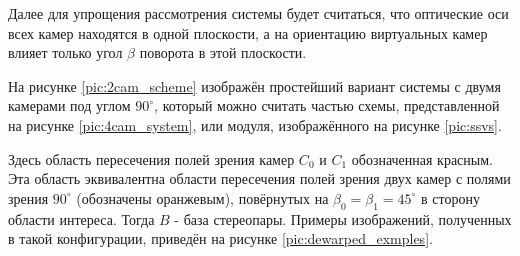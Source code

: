 Далее для упрощения рассмотрения системы будет считаться, что оптические оси всех камер находятся в одной плоскости, 
а на ориентацию виртуальных камер влияет только угол $ \beta $ поворота в этой плоскости. 

На рисунке \ref{pic:2cam_scheme} изображён простейший вариант системы с двумя камерами под углом $90^\circ$, который можно  считать частью
схемы, представленной на рисунке \ref{pic:4cam_system}, или модуля, изображённого  на рисунке \ref{pic:ssvs}. 


  Здесь область пересечения полей зрения камер $C_0$ и $C_1$ обозначенная красным.
Эта область эквивалентна области пересечения полей зрения двух камер с полями зрения $90^\circ$ (обозначены
оранжевым), повёрнутых на $\beta_0 = \beta_1  = 45^\circ$ в сторону области интереса. Тогда $B$ - база стереопары.
Примеры изображений, полученных в такой конфигурации, приведён на рисунке \ref{pic:dewarped_exmples}. 



